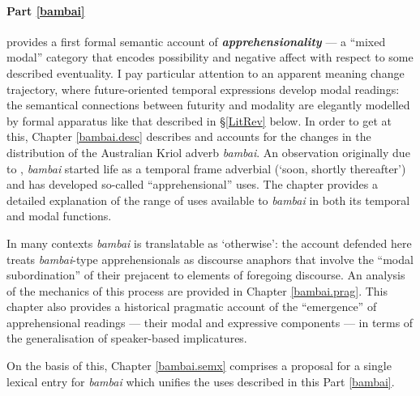 \documentclass[11pt,dvipsnames]{report}
\begin{document}
\paragraph{Part \ref{bambai}} provides a first formal semantic account of \textbf{\textit{apprehensionality}} --- a ``mixed modal'' category that encodes possibility and negative affect with respect to some described eventuality. I pay particular attention to an apparent meaning change trajectory, where future-oriented temporal expressions develop modal readings: the semantical connections between futurity and modality are elegantly modelled by formal apparatus like that described in \S \ref{LitRev} below. In order to get at this, Chapter \ref{bambai.desc} describes and accounts for the changes in the distribution of the Australian Kriol adverb \textit{bambai}. An observation originally due to \citet{Angelo2016,Angelo2018}, \textit{bambai} started life as a temporal frame adverbial (`soon, shortly thereafter') and has developed so-called ``apprehensional'' uses. The chapter provides a detailed explanation of the range of uses available to \textit{bambai} in both its temporal and modal functions. 

In many contexts \textit{bambai} is translatable as `otherwise': the account defended here treats \textit{bambai}-type apprehensionals as discourse anaphors that involve the ``modal subordination'' of their prejacent to elements of foregoing discourse. An analysis of the mechanics of this process are provided in Chapter \ref{bambai.prag}. This chapter also provides a historical pragmatic account of the ``emergence'' of apprehensional readings --- their modal and expressive components --- in terms of the generalisation of speaker-based implicatures.

On the basis of this, Chapter \ref{bambai.semx} comprises a proposal for a single lexical entry for \textit{bambai} which unifies the uses described in this Part \ref{bambai}. 
\end{document}
